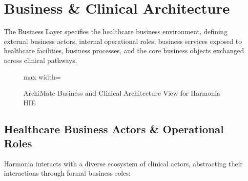 
\chapter{Business \& Clinical Architecture}
\label{chap:business_layer}

The Business Layer specifies the healthcare business environment, defining external business actors, internal operational roles, business services exposed to healthcare facilities, business processes, and the core business objects exchanged across clinical pathways.

\begin{figure}[htbp]
    \centering
    \begin{adjustbox}{max width=\textwidth}
        
    \end{adjustbox}
    \caption{ArchiMate Business and Clinical Architecture View for Harmonia HIE}
    \label{fig:clinical_process}
\end{figure}

\section{Healthcare Business Actors \& Operational Roles}

Harmonia interacts with a diverse ecosystem of clinical actors, abstracting their interactions through formal business roles:

